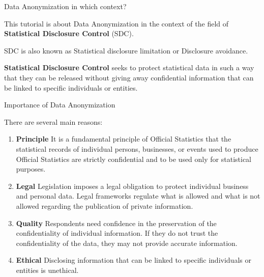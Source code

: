 \documentclass[
	aspectratio = 169
 ]{beamer}
\begin{document}
\begin{frame}{Data Anonymization in which context?}

This tutorial is about Data Anonymization in the context of the field of
\textbf{Statistical Disclosure Control} (SDC).

SDC is also known as Statistical disclosure limitation or Disclosure
avoidance.

\vspace{1cm}

\textbf{Statistical Disclosure Control} seeks to protect statistical
data in such a way that they can be released without giving away
confidential information that can be linked to specific individuals or
entities.
\end{frame}

\begin{frame}{Importance of Data Anonymization}

There are several main reasons:

\begin{enumerate}
\item
  \textbf{Principle} It is a fundamental principle of Official
  Statistics that the statistical records of individual persons,
  businesses, or events used to produce Official Statistics are strictly
  confidential and to be used only for statistical purposes.
\item
  \textbf{Legal} Legislation imposes a legal obligation to protect
  individual business and personal data. Legal frameworks regulate what
  is allowed and what is not allowed regarding the publication of
  private information.
\item
  \textbf{Quality} Respondents need confidence in the preservation of
  the confidentiality of individual information. If they do not trust
  the confidentiality of the data, they may not provide accurate
  information.
\item
  \textbf{Ethical} Disclosing information that can be linked to specific
  individuals or entities is unethical.
\end{enumerate}
\end{frame}
\end{document}
